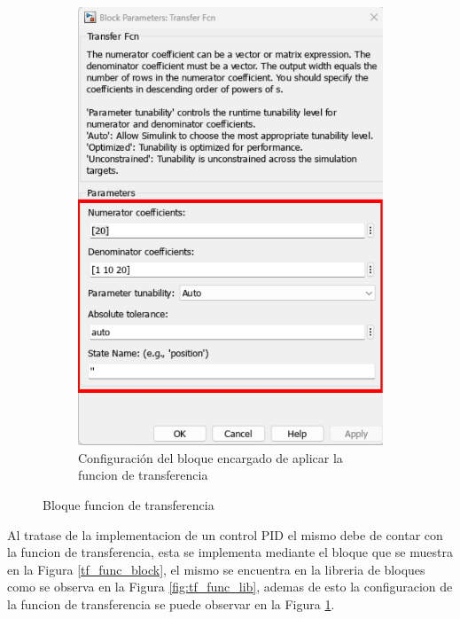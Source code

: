 \begin{figure}[htbp]
\begin{subfigure}[b]{0.45\textwidth}
        \includegraphics[width=\textwidth]{fig/Capitulo5/Caso_de_estudio_PID/config_transfer_function.pdf}
        \caption{Configuración del bloque encargado de aplicar la funcion de transferencia}
        \label{fig:tf_func_conf}
    \end{subfigure}
    \caption{Bloque funcion de transferencia}
    \label{fig:tf_func_block}
\end{figure}

Al tratase de la implementacion de un control PID el mismo debe de contar con la funcion de transferencia, esta se implementa mediante el bloque que se muestra en la Figura \ref{tf_func_block}, el mismo se encuentra en la libreria de bloques como se observa en la Figura \ref{fig:tf_func_lib}, ademas de esto la configuracion de la funcion de transferencia se puede observar en la Figura \ref{fig:tf_func_conf}.

